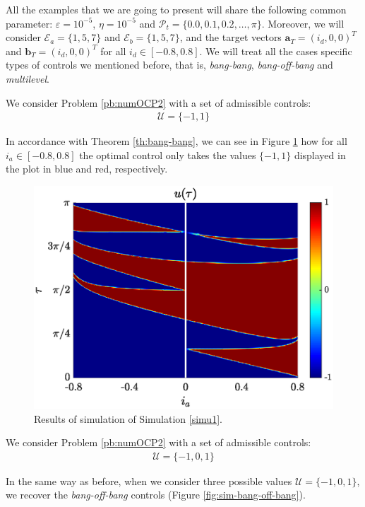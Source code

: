 \documentclass[twocolumn]{autart}    %
\begin{document}
\begin{remark}
All the examples that we are going to present will share the following common parameter: $\varepsilon = 10^{-5}$, $\eta = 10^{-5}$ and $\mathcal{P}_t = \{0.0 , 0.1, 0.2 ,\dots,\pi\}$. Moreover, we will consider $\mathcal{E}_a = \{1,5,7\}$ and  $\mathcal{E}_b = \{1,5,7\}$, and the target vectors $\bm{a}_T = (i_d,0,0)^T$ and $\bm{b}_T = (i_d,0,0)^T$ for all $i_d \in [-0.8,0.8]$. We will treat all the cases specific types of controls we mentioned before, that is, \emph{bang-bang}, \emph{bang-off-bang} and \textit{multilevel}. 

\vspace{1em}
\begin{simulation}\label{simu1}
We consider Problem \ref{pb:numOCP2} with a set of admissible controls:
\begin{align*}
    \mathcal{U} = \{-1,1\}
\end{align*}
\end{simulation}
In accordance with Theorem \ref{th:bang-bang}, we can see in Figure \ref{fig:sim-bang-bang} how for all $i_a \in [-0.8,0.8]$ the optimal control only takes the values $\{-1,1\}$ displayed in the plot in blue and red, respectively.

\begin{figure}[ht!]
    \hspace{0.05em}
    \includegraphics[scale=0.525]{img/fig05.eps}
    \caption{Results of simulation of Simulation \ref{simu1}.}\label{fig:sim-bang-bang}
\end{figure} 

\vspace{1em}
\begin{simulation}\label{simu2}
We consider Problem \ref{pb:numOCP2} with a set of admissible controls:
\begin{align*}
	\mathcal{U} = \{-1,0,1\}
\end{align*}
\end{simulation}
In the same way as before, when we consider three possible values $\mathcal U = \{-1,0,1\}$, we recover the \emph{bang-off-bang} controls (Figure \ref{fig:sim-bang-off-bang}).


\end{remark}
\end{document}
